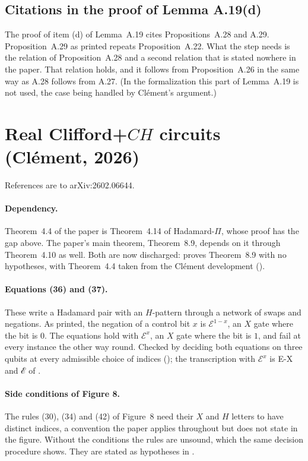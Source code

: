 \documentclass[11pt]{article}
\newcommand{\aid}[1]{\mbox{\textsf{\small #1}}}
\begin{document}
\subsection{Citations in the proof of Lemma A.19(d)}

The proof of item (d) of Lemma~A.19 cites Propositions~A.28 and A.29.
Proposition~A.29 as printed repeats Proposition~A.22. What the step
needs is the relation of Proposition~A.28 and a second relation that
is stated nowhere in the paper. That relation holds, and it follows
from Proposition~A.26 in the same way as A.28 follows from A.27. (In
the formalization this part of Lemma~A.19 is not used, the case being
handled by Cl\'ement's argument.)

\section{Real Clifford+\texorpdfstring{$CH$}{CH} circuits (Cl\'ement, 2026)}

References are to arXiv:2602.06644.

\paragraph{Dependency.} Theorem~4.4 of the paper is Theorem~4.14 of
Hadamard-$\Pi$, whose proof has the gap above. The paper's main
theorem, Theorem~8.9, depends on it through Theorem~4.10 as well. Both
are now discharged:  proves
Theorem~8.9 with no hypotheses, with Theorem~4.4 taken from the
Cl\'ement development ().

\paragraph{Equations (36) and (37).} These write a Hadamard pair with
an $H$-pattern through a network of swaps and negations. As printed,
the negation of a control bit $x$ is $\mathcal{E}^{1-x}$, an $X$ gate
where the bit is $0$. The equations hold with $\mathcal{E}^{x}$, an
$X$ gate where the bit is $1$, and fail at every instance the other
way round. Checked by deciding both equations on three qubits at every
admissible choice of indices ();
the transcription with $\mathcal{E}^{x}$ is \aid{E-X} and \aid{ℰ} of
.

\paragraph{Side conditions of Figure 8.} The rules (30), (34) and (42)
of Figure~8 need their $X$ and $H$ letters to have distinct indices, a
convention the paper applies throughout but does not state in the
figure. Without the conditions the rules are unsound, which the same
decision procedure shows. They are stated as hypotheses in
.
\end{document}
